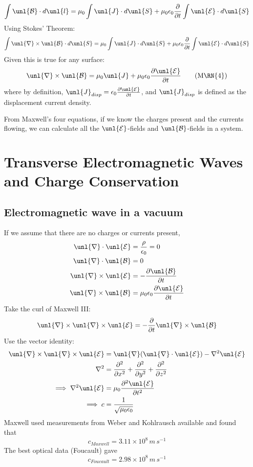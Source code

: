 \documentclass[a4paper, 11pt, normalem]{report}
\newcommand\p{\partial}
\newcommand\E{\mathcal{E}}
\newcommand\uE{\unl{\E}}
\newcommand\B{\mathcal{B}}
\newcommand\uB{\unl{\B}}
\newcommand\del{\unl{\nabla}}
\newcommand\eno{\epsilon_0}
\newcommand\J{\unl{J}}
\begin{document}
\begin{equation}
    \int \uB \cdot d\unl{l} = \mu_0 \int \J \cdot d\unl{S} + \mu_0\eno\frac{\p}{\p t} \int \uE \cdot d\unl{S}
\end{equation}
Using Stokes' Theorem:
\begin{equation}
    \int \del \times \uB \cdot d\unl{S} = \mu_0 \int \J \cdot d\unl{S} + \mu_0\eno\frac{\p}{\p t} \int \uE\cdot d\unl{S}
\end{equation}
Given this is true for any surface:
\begin{equation}
    \del \times \uB = \mu_0\J + \mu_0\eno\frac{\p \uE}{\p t} \tag{M\RN{4}}
\end{equation}
where by definition, $\J_{disp} = \eno\frac{\p\uE}{\p t}$, and $\J_{disp}$ is defined as the displacement current density.

From Maxwell's four equations, if we know the charges present and the currents flowing, we can calculate all the $\uE$-fields and $\uB$-fields in a system.

\section{Transverse Electromagnetic Waves and Charge Conservation}
\subsection{Electromagnetic wave in a vacuum}
If we assume that there are no charges or currents present,
\begin{align}
    \del \cdot \uE &= \frac{\rho}{\eno} = 0 \\
    \del \cdot \uB &= 0 \\
    \del \times \uE &= -\frac{\p \uB}{\p t} \\
    \del \times \uB &= \mu_0\eno\frac{\p\uE}{\p t}
\end{align}
Take the curl of Maxwell \RN{3}:
\begin{equation}
    \del \times \del \times \uE = -\frac{\p}{\p t} \del \times \uB
\end{equation}
Use the vector identity:
\begin{align}
    \del \times \del \times \uE &= \del(\del\cdot\uE) - \nabla^2\uE \\
    \nabla^2 &= \frac{\p^2}{\p x^2} + \frac{\p^2}{\p y^2} + \frac{\p^2}{\p z^2} \\
    \implies \nabla^2\uE &= \mu_0 \frac{\p^2 \uE}{\p t^2} \\
    \implies c &= \frac{1}{\sqrt{\mu_0\eno}}
\end{align}
Maxwell used measurements from Weber and Kohlrausch available and found that
\begin{equation}
    c_{Maxwell} = 3.11\times10^8 \,m\,s^{-1}
\end{equation}
The best optical data (Foucault) gave
\begin{equation}
    c_{Foucault} = 2.98\times10^8\,m\,s^{-1}
\end{equation}
\end{document}
